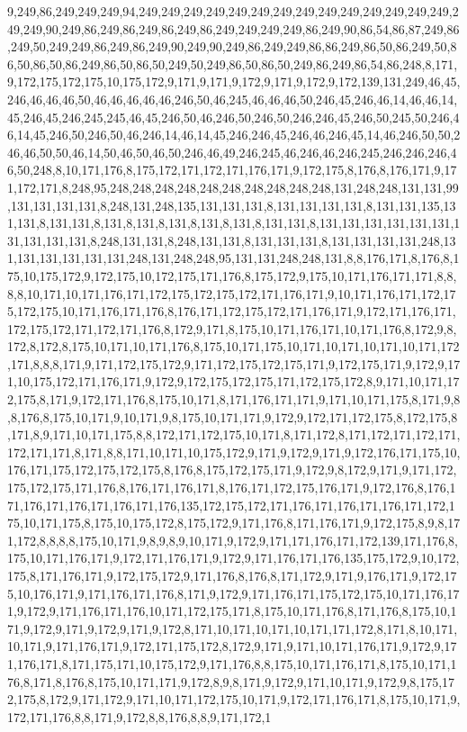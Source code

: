 9,249,86,249,249,249,94,249,249,249,249,249,249,249,249,249,249,249,249,249,249,249,249,90,249,86,249,86,249,86,249,86,249,249,249,249,86,249,90,86,54,86,87,249,86,249,50,249,249,86,249,86,249,90,249,90,249,86,249,249,86,86,249,86,50,86,249,50,86,50,86,50,86,249,86,50,86,50,249,50,249,86,50,86,50,249,86,249,86,54,86,248,8,171,9,172,175,172,175,10,175,172,9,171,9,171,9,172,9,171,9,172,9,172,139,131,249,46,45,246,46,46,46,50,46,46,46,46,46,246,50,46,245,46,46,46,50,246,45,246,46,14,46,46,14,45,246,45,246,245,245,46,45,246,50,46,246,50,246,50,246,246,45,246,50,245,50,246,46,14,45,246,50,246,50,46,246,14,46,14,45,246,246,45,246,46,246,45,14,46,246,50,50,246,46,50,50,46,14,50,46,50,46,50,246,46,49,246,245,46,246,46,246,245,246,246,246,46,50,248,8,10,171,176,8,175,172,171,172,171,176,171,9,172,175,8,176,8,176,171,9,171,172,171,8,248,95,248,248,248,248,248,248,248,248,248,248,131,248,248,131,131,99,131,131,131,131,8,248,131,248,135,131,131,131,8,131,131,131,131,8,131,131,135,131,131,8,131,131,8,131,8,131,8,131,8,131,8,131,8,131,131,8,131,131,131,131,131,131,131,131,131,131,8,248,131,131,8,248,131,131,8,131,131,131,8,131,131,131,131,248,131,131,131,131,131,131,248,131,248,248,95,131,131,248,248,131,8,8,176,171,8,176,8,175,10,175,172,9,172,175,10,172,175,171,176,8,175,172,9,175,10,171,176,171,171,8,8,8,8,10,171,10,171,176,171,172,175,172,175,172,171,176,171,9,10,171,176,171,172,175,172,175,10,171,176,171,176,8,176,171,172,175,172,171,176,171,9,172,171,176,171,172,175,172,171,172,171,176,8,172,9,171,8,175,10,171,176,171,10,171,176,8,172,9,8,172,8,172,8,175,10,171,10,171,176,8,175,10,171,175,10,171,10,171,10,171,10,171,172,171,8,8,8,171,9,171,172,175,172,9,171,172,175,172,175,171,9,172,175,171,9,172,9,171,10,175,172,171,176,171,9,172,9,172,175,172,175,171,172,175,172,8,9,171,10,171,172,175,8,171,9,172,171,176,8,175,10,171,8,171,176,171,171,9,171,10,171,175,8,171,9,8,8,176,8,175,10,171,9,10,171,9,8,175,10,171,171,9,172,9,172,171,172,175,8,172,175,8,171,8,9,171,10,171,175,8,8,172,171,172,175,10,171,8,171,172,8,171,172,171,172,171,172,171,171,8,171,8,8,171,10,171,10,175,172,9,171,9,172,9,171,9,172,176,171,175,10,176,171,175,172,175,172,175,8,176,8,175,172,175,171,9,172,9,8,172,9,171,9,171,172,175,172,175,171,176,8,176,171,176,171,8,176,171,172,175,176,171,9,172,176,8,176,171,176,171,176,171,176,171,176,135,172,175,172,171,176,171,176,171,176,171,172,175,10,171,175,8,175,10,175,172,8,175,172,9,171,176,8,171,176,171,9,172,175,8,9,8,171,172,8,8,8,8,175,10,171,9,8,9,8,9,10,171,9,172,9,171,171,176,171,172,139,171,176,8,175,10,171,176,171,9,172,171,176,171,9,172,9,171,176,171,176,135,175,172,9,10,172,175,8,171,176,171,9,172,175,172,9,171,176,8,176,8,171,172,9,171,9,176,171,9,172,175,10,176,171,9,171,176,171,176,8,171,9,172,9,171,176,171,175,172,175,10,171,176,171,9,172,9,171,176,171,176,10,171,172,175,171,8,175,10,171,176,8,171,176,8,175,10,171,9,172,9,171,9,172,9,171,9,172,8,171,10,171,10,171,10,171,171,172,8,171,8,10,171,10,171,9,171,176,171,9,172,171,175,172,8,172,9,171,9,171,10,171,176,171,9,172,9,171,176,171,8,171,175,171,10,175,172,9,171,176,8,8,175,10,171,176,171,8,175,10,171,176,8,171,8,176,8,175,10,171,171,9,172,8,9,8,171,9,172,9,171,10,171,9,172,9,8,175,172,175,8,172,9,171,172,9,171,10,171,172,175,10,171,9,172,171,176,171,8,175,10,171,9,172,171,176,8,8,171,9,172,8,8,176,8,8,9,171,172,1